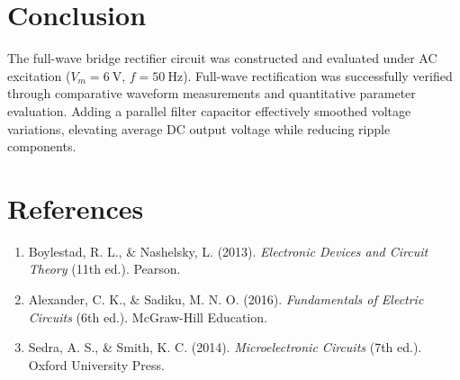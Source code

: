 \section{Conclusion}
The full-wave bridge rectifier circuit was constructed and evaluated under AC excitation ($V_m=\qty{6}{\volt}$, $f=\qty{50}{\hertz}$). Full-wave rectification was successfully verified through comparative waveform measurements and quantitative parameter evaluation. Adding a parallel filter capacitor effectively smoothed voltage variations, elevating average DC output voltage while reducing ripple components.

\section{References}
\begin{tcolorbox}[colback=gray!5, colframe=gray!40, arc=2mm]
	\begin{enumerate}
		\item Boylestad, R. L., \& Nashelsky, L. (2013). \textit{Electronic Devices and Circuit Theory} (11th ed.). Pearson.
		\item Alexander, C. K., \& Sadiku, M. N. O. (2016). \textit{Fundamentals of Electric Circuits} (6th ed.). McGraw-Hill Education.
		\item Sedra, A. S., \& Smith, K. C. (2014). \textit{Microelectronic Circuits} (7th ed.). Oxford University Press.
	\end{enumerate}
\end{tcolorbox}